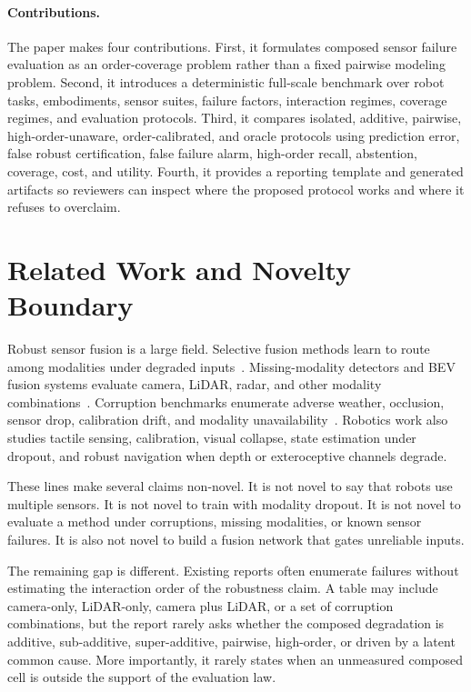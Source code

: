 \documentclass{article}
\begin{document}
\paragraph{Contributions.}
The paper makes four contributions. First, it formulates composed sensor failure evaluation as an order-coverage problem rather than a fixed pairwise modeling problem. Second, it introduces a deterministic full-scale benchmark over robot tasks, embodiments, sensor suites, failure factors, interaction regimes, coverage regimes, and evaluation protocols. Third, it compares isolated, additive, pairwise, high-order-unaware, order-calibrated, and oracle protocols using prediction error, false robust certification, false failure alarm, high-order recall, abstention, coverage, cost, and utility. Fourth, it provides a reporting template and generated artifacts so reviewers can inspect where the proposed protocol works and where it refuses to overclaim.

\section{Related Work and Novelty Boundary}

Robust sensor fusion is a large field. Selective fusion methods learn to route among modalities under degraded inputs~\citep{selectfusion}. Missing-modality detectors and BEV fusion systems evaluate camera, LiDAR, radar, and other modality combinations~\citep{unibev,mscb}. Corruption benchmarks enumerate adverse weather, occlusion, sensor drop, calibration drift, and modality unavailability~\citep{mscb,mutebench}. Robotics work also studies tactile sensing, calibration, visual collapse, state estimation under dropout, and robust navigation when depth or exteroceptive channels degrade.

These lines make several claims non-novel. It is not novel to say that robots use multiple sensors. It is not novel to train with modality dropout. It is not novel to evaluate a method under corruptions, missing modalities, or known sensor failures. It is also not novel to build a fusion network that gates unreliable inputs.

The remaining gap is different. Existing reports often enumerate failures without estimating the interaction order of the robustness claim. A table may include camera-only, LiDAR-only, camera plus LiDAR, or a set of corruption combinations, but the report rarely asks whether the composed degradation is additive, sub-additive, super-additive, pairwise, high-order, or driven by a latent common cause. More importantly, it rarely states when an unmeasured composed cell is outside the support of the evaluation law.
\end{document}
